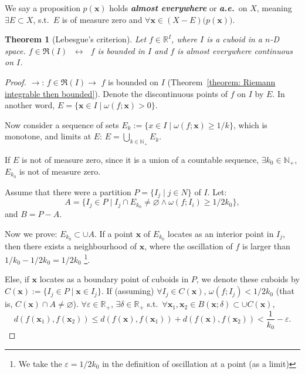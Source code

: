 \documentclass[openany]{book}
\newcommand*{\indexbf}[1]{\emph{\textbf{#1}}\index{#1}} %
\theoremstyle{plain}
\newtheorem{theorem}{Theorem}[section] %
\theoremstyle{definition}
\newcommand*{\bv}{\boldsymbol} %
\newcommand*{\IFF}{\;\leftrightarrow\;} %
\begin{document}
We say a proposition $p(\bv x)$ holds \indexbf{almost everywhere} or \indexbf{a.e.}\ on $X$, meaning $\exists E \subset X$, s.t.\ $E$ is of measure zero and $\forall \bv x \in (X - E) \big(p (\bv x)\big)$. 

\begin{theorem}[Lebesgue's criterion]
	\label{theorem: Lebesgue's criterion}
	Let $f \in \mathbb R^I$, where $I$ is a cuboid in a $n$-D space.
	$f \in \mathfrak R(I)$ $\IFF$ $f$ is bounded in $I$ and $f$ is almost everywhere continuous on $I$.
\end{theorem}
\begin{proof}
	$\to$: $f \in \mathfrak R(I) \to$ $f$ is bounded on $I$ (Theorem~\ref{theorem: Riemann integrable then bounded}).
	Denote the discontinuous points of $f$ on $I$ by $E$. In another word, $E = \{\bv x \in I \mid \omega(f; \bv x) > 0\}$.

	Now consider a sequence of sets $E_k := \{x \in I \mid \omega(f; \bv x) \geq 1/k\}$, which is monotone, and limits at $E$: $E = \bigcup_{k \in \mathbb N_+} E_k$.

	If $E$ is not of measure zero, since it is a union of a countable sequence, $\exists k_0 \in \mathbb N_+$, $E_{k_0}$ is not of measure zero.

	Assume that there were a partition $P = \{I_j \mid j \in N\}$ of $I$. Let:
	\begin{equation*}
		A = \{I_j \in P \mid I_j \cap E_{k_0} \neq \varnothing \wedge \omega(f; I_i) \geq 1/2k_0\},
	\end{equation*}
	and $B = P - A$.

	Now we prove: $E_{k_0} \subset \cup A$. 
	If a point $\bv x$ of $E_{k_0}$ locates as an interior point in $I_j$, then there exists a neighbourhood of $\bv x$, where the oscillation of $f$ is larger than $1/k_0 - 1/2k_0 = 1/2k_0$
		\footnote{We take the $\varepsilon = 1/2k_0$ in the definition of oscillation at a point (as a limit)}.
	
	Else, if $\bv x$ locates as a boundary point of cuboids in $P$, we denote these cuboids by $C(\bv x) := \{I_j \in P \mid \bv x \in I_j\}$. 
	If (assuming) $\forall I_j \in C(\bv x)$, $\omega(f; I_j) < 1/2k_0$ (that is, $C(\bv x) \cap A \neq \varnothing$). $\forall \varepsilon \in \mathbb R_+$, $\exists \delta \in \mathbb R_+$ s.t.\ $\forall \bv x_1, \bv x_2 \in B(\bv x; \delta)\subset \cup C(\bv x) $, 
	\begin{equation*}
		d(f(\bv x_1), f(\bv x_2)) \leq d(f(\bv x), f(\bv x_1)) + d(f(\bv x), f(\bv x_2)) < \frac{1}{k_0} - \varepsilon.
	\end{equation*}


\end{proof}
\end{document}
